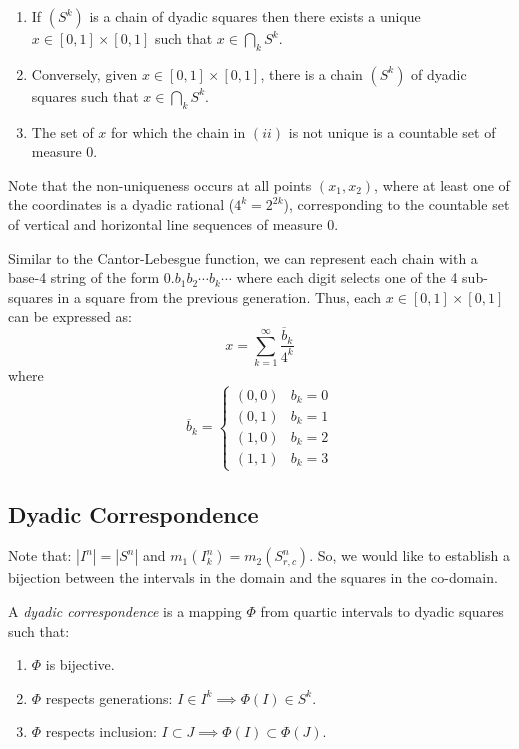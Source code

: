 \documentclass[letterpaper,12pt,fleqn]{article}
\newcommand{\uint}{[0,1]}
\newcommand{\usq}{\uint\times\uint}
\begin{document}
\begin{properties}
\listbreak
\begin{enumerate}
\item If $(S^k)$ is a chain of dyadic squares then there exists a unique
$x\in\usq$ such that $x\in\bigcap_kS^k$.

\item Conversely, given $x\in\usq$, there is a chain $(S^k)$ of dyadic
squares such that $x\in\bigcap_kS^k$.

\item The set of $x$ for which the chain in $(ii)$ is not unique is a countable
set of measure 0.
\end{enumerate}
\end{properties}

Note that the non-uniqueness occurs at all points $(x_1,x_2)$, where at least
one of the coordinates is a dyadic rational ($4^k=2^{2k}$), corresponding to the
countable set of vertical and horizontal line sequences of measure 0.

Similar to the Cantor-Lebesgue function, we can represent each chain
with a base-4 string of the form $0.b_1b_2\cdots b_k\cdots$ where each digit
selects one of the 4 sub-squares in a square from the previous generation.
Thus, each $x\in\usq$ can be expressed as:
\[x=\sum_{k=1}^{\infty}\frac{\overline{b}_k}{4^k}\]
where
\[\overline{b}_k=\left\{\begin{array}{ll}
(0,0) & b_k=0 \\
(0,1) & b_k=1 \\
(1,0) & b_k=2 \\
(1,1) & b_k=3\end{array}
\right.\]

\newpage

\subsection*{Dyadic Correspondence}

Note that: $|I^n|=|S^n|$ and $m_1(I_k^n)=m_2(S_{r,c}^n)$. So, we would like to
establish a bijection between the intervals in the domain and the squares in
the co-domain.

\begin{definition}
A \emph{dyadic correspondence} is a mapping $\Phi$ from quartic intervals to
dyadic squares such that:
\begin{enumerate}
\item $\Phi$ is bijective.
\item $\Phi$ respects generations: $I\in I^k\implies\Phi(I)\in S^k$.
\item $\Phi$ respects inclusion: $I\subset J\implies\Phi(I)\subset\Phi(J)$.
\end{enumerate}
\end{definition}
\end{document}
